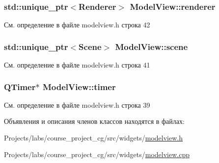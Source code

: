 \subsubsection[{\texorpdfstring{renderer}{renderer}}]{\setlength{\rightskip}{0pt plus 5cm}std\+::unique\+\_\+ptr$<${\bf Renderer}$>$ Model\+View\+::renderer\hspace{0.3cm}{\ttfamily [private]}}\hypertarget{class_model_view_a80052c0ef06cceacb0a1fdf3bc045847}{}\label{class_model_view_a80052c0ef06cceacb0a1fdf3bc045847}


См. определение в файле modelview.\+h строка 42

\subsubsection[{\texorpdfstring{scene}{scene}}]{\setlength{\rightskip}{0pt plus 5cm}std\+::unique\+\_\+ptr$<${\bf Scene}$>$ Model\+View\+::scene\hspace{0.3cm}{\ttfamily [private]}}\hypertarget{class_model_view_a41e5d7792517ae9880d9c129026b0c84}{}\label{class_model_view_a41e5d7792517ae9880d9c129026b0c84}


См. определение в файле modelview.\+h строка 41

\subsubsection[{\texorpdfstring{timer}{timer}}]{\setlength{\rightskip}{0pt plus 5cm}Q\+Timer$\ast$ Model\+View\+::timer\hspace{0.3cm}{\ttfamily [private]}}\hypertarget{class_model_view_a473071f2a4321959097270980678c863}{}\label{class_model_view_a473071f2a4321959097270980678c863}


См. определение в файле modelview.\+h строка 39



Объявления и описания членов классов находятся в файлах\+:\begin{DoxyCompactItemize}
\item 
Projects/labs/course\+\_\+project\+\_\+cg/src/widgets/\hyperlink{modelview_8h}{modelview.\+h}\item 
Projects/labs/course\+\_\+project\+\_\+cg/src/widgets/\hyperlink{modelview_8cpp}{modelview.\+cpp}\end{DoxyCompactItemize}
